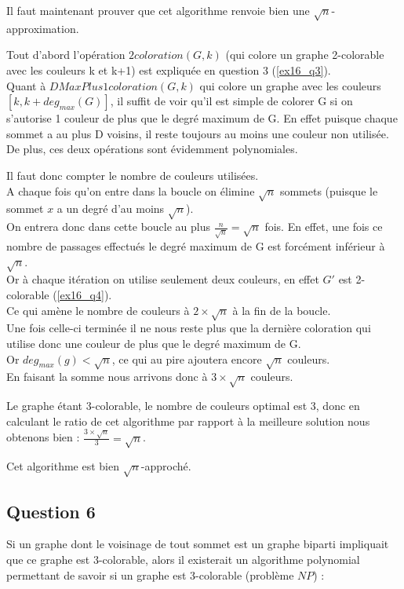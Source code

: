 Il faut maintenant prouver que cet algorithme renvoie bien une $\sqrt{n}$-approximation.

Tout d'abord l'op\'eration $2coloration(G,k)$ (qui colore un graphe 2-colorable avec
les couleurs k et k+1) est expliqu\'ee en question 3 (\ref{ex16_q3}).\\
Quant \`a $DMaxPlus1coloration(G,k)$ qui colore un graphe avec les couleurs
$[k,k+deg_{max}(G)]$, il suffit de voir qu'il est simple de colorer G si on s'autorise 1
couleur de plus que le degr\'e maximum de G.
En effet puisque chaque sommet a au plus D voisins, il reste toujours au moins une
couleur non utilis\'ee.\\
De plus, ces deux op\'erations sont \'evidemment polynomiales.

Il faut donc compter le nombre de couleurs utilis\'ees.\\
A chaque fois qu'on entre dans la boucle on \'elimine $\sqrt{n}$ sommets (puisque le
sommet $x$ a un degr\'e d'au moins $\sqrt{n}$).\\
On entrera donc dans cette boucle au plus $\frac{n}{\sqrt{n}} = \sqrt{n}$ fois.
En effet, une fois ce nombre de passages effectu\'es le degr\'e maximum de G est
forc\'ement inf\'erieur \`a $\sqrt{n}$.\\
Or \`a chaque it\'eration on utilise seulement deux couleurs, en effet $G'$ est
2-colorable (\ref{ex16_q4}).\\
Ce qui am\`ene le nombre de couleurs \`a $2 \times \sqrt{n}$ \`a la fin de la boucle.\\
Une fois celle-ci termin\'ee il ne nous reste plus que la derni\`ere coloration qui
utilise donc une couleur de plus que le degr\'e maximum de G.\\
Or $deg_{max}(g) < \sqrt{n}$, ce qui au pire ajoutera encore $\sqrt{n}$ couleurs.\\
En faisant la somme nous arrivons donc \`a $3 \times \sqrt{n}$ couleurs.

Le graphe \'etant 3-colorable, le nombre de couleurs optimal est 3, donc en calculant le
ratio de cet algorithme par rapport \`a la meilleure solution nous obtenons bien :
$\frac{3 \times \sqrt{n}}{3} = \sqrt{n}$.

Cet algorithme est bien $\sqrt{n}$-approch\'e.

\subsection{Question 6}\label{ex16_q6}
Si un graphe dont le voisinage de tout sommet est un graphe biparti impliquait que ce
graphe est 3-colorable, alors il existerait un algorithme polynomial permettant de
savoir si un graphe est 3-colorable (probl\`eme $NP$) :

